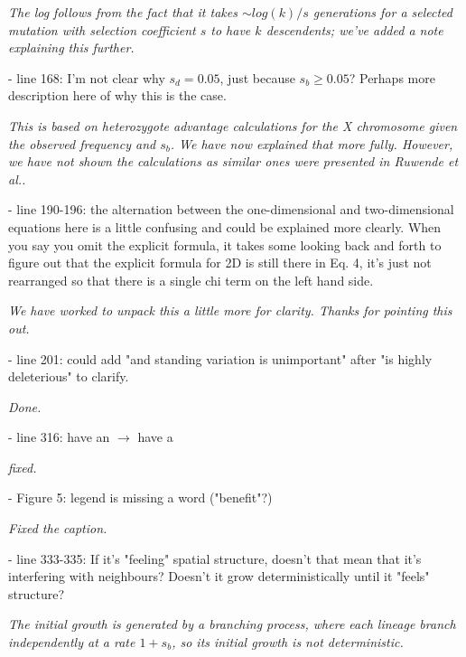 \documentclass[12pt,letterpaper]{article}
\newcommand{\response}[1]{\emph{ \color{blue} #1}}
\begin{document}
\response{The log follows from the fact that it takes $\sim log(k)/s$ generations for a selected mutation with selection coefficient $s$ to have $k$ descendents; we've added a note explaining this further.}


- line 168: I'm not clear why $s_d = 0.05$, just because $s_b \ge 0.05$? Perhaps more description here of why this is the case.

\response{This is based on heterozygote advantage calculations for the X chromosome given the observed frequency and $s_b$. We have now explained that more fully. However, we have not shown the calculations as similar ones were presented in Ruwende et al..}

- line 190-196: the alternation between the one-dimensional and two-dimensional equations here is a little confusing and could be explained more clearly. When you say you omit the explicit formula, it takes some looking back and forth to figure out that the explicit formula for 2D is still there in Eq. 4, it's just not rearranged so that there is a single chi term on the left hand side.

\response{We have worked to unpack this a little more for clarity. Thanks for pointing this out.}

- line 201: could add "and standing variation is unimportant" after "is highly deleterious" to clarify.

\response{Done.}

- line 316: have an $\rightarrow$ have a

\response{fixed.}

- Figure 5: legend is missing a word ("benefit"?)

\response{Fixed the caption.}

- line 333-335: If it's "feeling" spatial structure, doesn't that mean that it's interfering with neighbours? Doesn't it grow deterministically until it "feels" structure?

\response{The initial growth is generated by a branching process, where each lineage branch independently at a rate $1+s_b$, so its initial growth is not deterministic.}
\end{document}
